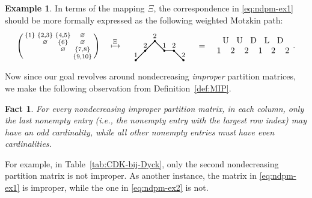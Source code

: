 \documentclass[12pt,reqno]{amsart}
\numberwithin{equation}{section}
\theoremstyle{theorem}
\newtheorem{fact}[theorem]{Fact}
\theoremstyle{definition}
\newtheorem{example}[theorem]{Example}
\theoremstyle{named}
\newcommand{\rU}{\mathrm{U}}
\newcommand{\rD}{\mathrm{D}}
\newcommand{\rL}{\mathrm{L}}
\begin{document}
\begin{example}
	In terms of the mapping $\Xi$, the correspondence in \eqref{eq:ndpm-ex1} should be more formally expressed as the following weighted Motzkin path:
	\begin{align*}
		\begin{psmallmatrix}
			\{1\} & \{2,3\} & \{4,5\} & \varnothing\\
			& \varnothing & \{6\} & \varnothing\\
			& & \varnothing & \{7,8\}\\
			& & & \{9,10\}
		\end{psmallmatrix} \quad\xmapsto{\Xi}\quad \vcenter{\hbox{\begin{tikzpicture}[line width=0.8pt,scale=0.4]
					\coordinate (O) at (0,0);
					\draw[thick] (O)--++(1,1)--++(1,1)--++(1,-1)--++(1,0)--++(1,-1);
					\filldraw (O) circle(0.5ex) ++(1,1)circle(0.5ex) ++(1,1)circle(0.5ex) ++(1,-1)circle(0.5ex)
					++(1,0)circle(0.5ex) ++(1,-1)circle(0.5ex);
					\node[above] at (0,0) {\footnotesize $1$};
					\node[above] at (1,1) {\footnotesize $2$};
					\node[above] at (2,2) {\footnotesize $2$};
					\node[above] at (3,1) {\footnotesize $1$};
					\node[above] at (4,1) {\footnotesize $2$};
					\node[above] at (5,0) {\footnotesize $2$};
		\end{tikzpicture}}} \quad = \quad 
		{\setlength{\arraycolsep}{1pt}\begin{array}{ccccccccccc}
				& \rU & & \rU & & \rD & & \rL & & \rD\\
				1 & & 2 & & 2 & & 1 & & 2 & & 2
		\end{array}}\,\,.
	\end{align*}
\end{example}

Now since our goal revolves around nondecreasing \emph{improper} partition matrices, we make the following observation from Definition~\ref{def:MIP}.

\begin{fact}\label{fact:NDIPPM}
	For every nondecreasing improper partition matrix, in each column, only the last nonempty entry (i.e., the nonempty entry with the largest row index) may have an odd cardinality, while all other nonempty entries must have even cardinalities.
\end{fact}

For example, in Table~\ref{tab:CDK-bij-Dyck}, only the second nondecreasing partition matrix is not improper. As another instance, the matrix in \eqref{eq:ndpm-ex1} is improper, while the one in \eqref{eq:ndpm-ex2} is not.
\end{document}
